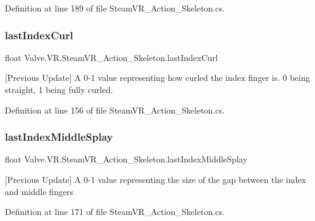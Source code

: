 Definition at line 189 of file Steam\+V\+R\+\_\+\+Action\+\_\+\+Skeleton.\+cs.

\mbox{\label{class_valve_1_1_v_r_1_1_steam_v_r___action___skeleton_a4b919dd07d6e23badae877e2e9cc1f26}} 
\subsubsection{\texorpdfstring{lastIndexCurl}{lastIndexCurl}}
{\footnotesize\ttfamily float Valve.\+V\+R.\+Steam\+V\+R\+\_\+\+Action\+\_\+\+Skeleton.\+last\+Index\+Curl\hspace{0.3cm}{\ttfamily [get]}}



\mbox{[}Previous Update\mbox{]} A 0-\/1 value representing how curled the index finger is. 0 being straight, 1 being fully curled. 



Definition at line 156 of file Steam\+V\+R\+\_\+\+Action\+\_\+\+Skeleton.\+cs.

\mbox{\label{class_valve_1_1_v_r_1_1_steam_v_r___action___skeleton_a95ef4f48c69955e3fca33c609024be12}} 
\subsubsection{\texorpdfstring{lastIndexMiddleSplay}{lastIndexMiddleSplay}}
{\footnotesize\ttfamily float Valve.\+V\+R.\+Steam\+V\+R\+\_\+\+Action\+\_\+\+Skeleton.\+last\+Index\+Middle\+Splay\hspace{0.3cm}{\ttfamily [get]}}



\mbox{[}Previous Update\mbox{]} A 0-\/1 value representing the size of the gap between the index and middle fingers 



Definition at line 171 of file Steam\+V\+R\+\_\+\+Action\+\_\+\+Skeleton.\+cs.

